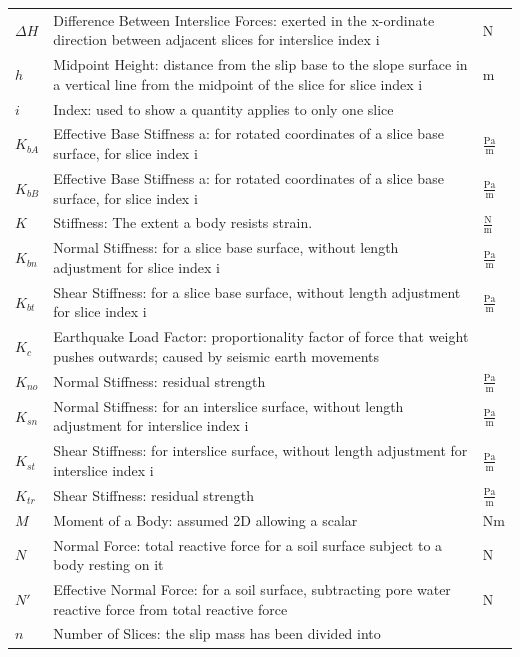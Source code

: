 \documentclass[12pt]{article}
\begin{document}
\begin{longtable*}{l l l}
\\
$\Delta{}H$ & Difference Between Interslice Forces: exerted in the x-ordinate direction between adjacent slices for interslice index i & N
\\
$h$ & Midpoint Height: distance from the slip base to the slope surface in a vertical line from the midpoint of the slice for slice index i & m
\\
$i$ & Index: used to show a quantity applies to only one slice & 
\\
$K_{bA}$ & Effective Base Stiffness a: for rotated coordinates of a slice base surface, for slice index i & $\frac{\text{Pa}}{\text{m}}$
\\
$K_{bB}$ & Effective Base Stiffness a: for rotated coordinates of a slice base surface, for slice index i & $\frac{\text{Pa}}{\text{m}}$
\\
$K$ & Stiffness: The extent a body resists strain. & $\frac{\text{N}}{\text{m}}$
\\
$K_{bn}$ & Normal Stiffness: for a slice base surface, without length adjustment for slice index i & $\frac{\text{Pa}}{\text{m}}$
\\
$K_{bt}$ & Shear Stiffness: for a slice base surface, without length adjustment for slice index i & $\frac{\text{Pa}}{\text{m}}$
\\
$K_{c}$ & Earthquake Load Factor: proportionality factor of force that weight pushes outwards; caused by seismic earth movements & 
\\
$K_{no}$ & Normal Stiffness: residual strength & $\frac{\text{Pa}}{\text{m}}$
\\
$K_{sn}$ & Normal Stiffness: for an interslice surface, without length adjustment for interslice index i & $\frac{\text{Pa}}{\text{m}}$
\\
$K_{st}$ & Shear Stiffness: for interslice surface, without length adjustment for interslice index i & $\frac{\text{Pa}}{\text{m}}$
\\
$K_{tr}$ & Shear Stiffness: residual strength & $\frac{\text{Pa}}{\text{m}}$
\\
$M$ & Moment of a Body: assumed 2D allowing a scalar & Nm
\\
$N$ & Normal Force: total reactive force for a soil surface subject to a body resting on it & N
\\
$N'$ & Effective Normal Force: for a soil surface, subtracting pore water reactive force from total reactive force & N
\\
$n$ & Number of Slices: the slip mass has been divided into & 
\\

\end{longtable*}
\end{document}
